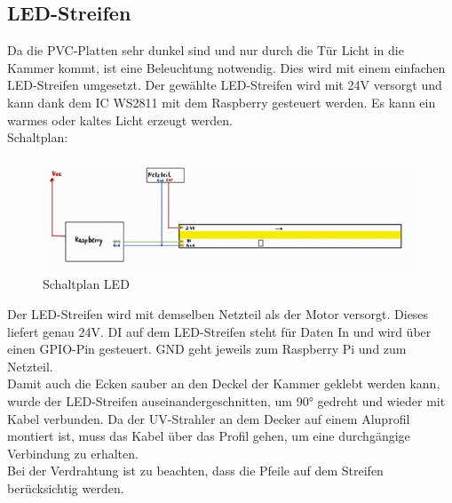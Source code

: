 \subsection{LED-Streifen}\label{sec:LED}
Da die PVC-Platten sehr dunkel sind und nur durch die Tür Licht in die Kammer kommt, ist eine Beleuchtung notwendig. Dies wird mit einem einfachen LED-Streifen umgesetzt. Der gewählte LED-Streifen wird mit 24V versorgt und kann dank dem IC WS2811 mit dem Raspberry gesteuert werden. Es kann ein warmes oder kaltes Licht erzeugt werden. \\
\vspace{3mm}
Schaltplan:\\
\vspace{2mm}
\begin{figure}[H]
    \centering
    \includegraphics[scale=1]{image/schaltplanled.jpg}
    \caption{Schaltplan LED}
    \label{fig:enter-label}
\end{figure}
\vspace{3mm}
Der LED-Streifen wird mit demselben Netzteil als der Motor versorgt. Dieses liefert genau 24V. DI auf dem LED-Streifen steht für Daten In und wird über einen GPIO-Pin gesteuert. GND geht jeweils zum Raspberry Pi und zum Netzteil. \\
\vspace{3mm}
Damit auch die Ecken sauber an den Deckel der Kammer geklebt werden kann, wurde der LED-Streifen auseinandergeschnitten, um 90° gedreht und wieder mit Kabel verbunden. Da der UV-Strahler an dem Decker auf einem Aluprofil montiert ist, muss das Kabel über das Profil gehen, um eine durchgängige Verbindung zu erhalten. \\
\vspace{3mm}
Bei der Verdrahtung ist zu beachten, dass die Pfeile auf dem Streifen berücksichtig werden. \\
\vspace{3mm}
